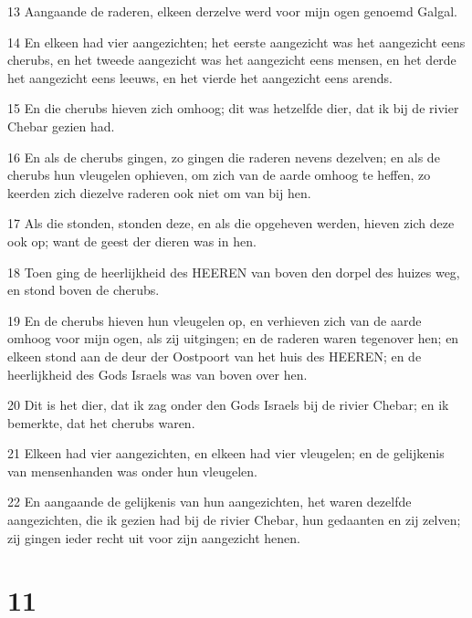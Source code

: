 \par 13 Aangaande de raderen, elkeen derzelve werd voor mijn ogen genoemd Galgal.
\par 14 En elkeen had vier aangezichten; het eerste aangezicht was het aangezicht eens cherubs, en het tweede aangezicht was het aangezicht eens mensen, en het derde het aangezicht eens leeuws, en het vierde het aangezicht eens arends.
\par 15 En die cherubs hieven zich omhoog; dit was hetzelfde dier, dat ik bij de rivier Chebar gezien had.
\par 16 En als de cherubs gingen, zo gingen die raderen nevens dezelven; en als de cherubs hun vleugelen ophieven, om zich van de aarde omhoog te heffen, zo keerden zich diezelve raderen ook niet om van bij hen.
\par 17 Als die stonden, stonden deze, en als die opgeheven werden, hieven zich deze ook op; want de geest der dieren was in hen.
\par 18 Toen ging de heerlijkheid des HEEREN van boven den dorpel des huizes weg, en stond boven de cherubs.
\par 19 En de cherubs hieven hun vleugelen op, en verhieven zich van de aarde omhoog voor mijn ogen, als zij uitgingen; en de raderen waren tegenover hen; en elkeen stond aan de deur der Oostpoort van het huis des HEEREN; en de heerlijkheid des Gods Israels was van boven over hen.
\par 20 Dit is het dier, dat ik zag onder den Gods Israels bij de rivier Chebar; en ik bemerkte, dat het cherubs waren.
\par 21 Elkeen had vier aangezichten, en elkeen had vier vleugelen; en de gelijkenis van mensenhanden was onder hun vleugelen.
\par 22 En aangaande de gelijkenis van hun aangezichten, het waren dezelfde aangezichten, die ik gezien had bij de rivier Chebar, hun gedaanten en zij zelven; zij gingen ieder recht uit voor zijn aangezicht henen.

\chapter{11}

